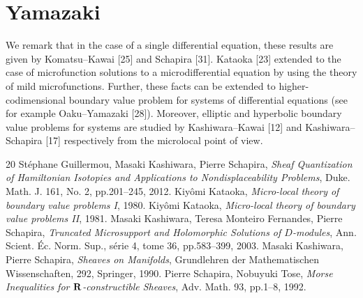 \section{Yamazaki}
We remark that in the case of a single differential equation, 
these results are given by 
Komatsu--Kawai [25] and Schapira [31]. 
Kataoka [23] extended to the case of microfunction solutions 
to a microdifferential equation by using the theory of 
mild microfunctions. 
Further, these facts can be extended to higher-codimensional 
boundary value problem for systems of 
differential equations (see for example Oaku--Yamazaki [28]). 
Moreover, elliptic and hyperbolic boundary value problems 
for systems are studied by Kashiwara--Kawai [12] and 
Kashiwara--Schapira [17] respectively from 
the microlocal point of view.

\begin{thebibliography}{20} 
   St\'ephane Guillermou, 
  Masaki Kashiwara, Pierre Schapira, 
  \textit{Sheaf Quantization of Hamiltonian Isotopies and Applications to Nondisplaceability Problems}, 
  Duke. Math. J. 161, No. 2, pp.201--245, 2012.  
   Kiy\^omi Kataoka, 
  \textit{Micro-local theory of boundary value problems I}, 1980.
   Kiy\^omi Kataoka, 
  \textit{Micro-local theory of boundary value problems II}, 1981.
   Masaki Kashiwara, Teresa Monteiro Fernandes, Pierre Schapira, 
    \textit{Truncated Microsupport and Holomorphic Solutions 
    of \(D\)-modules}, 
    Ann. Scient. \'Ec. Norm. Sup., s\'erie 4, tome 36, 
    pp.583--399, 2003.
   Masaki Kashiwara, Pierre Schapira, 
    \textit{Sheaves on Manifolds}, 
    Grundlehren der Mathematischen Wissenschaften, 292, Springer, 1990.
   Pierre Schapira, Nobuyuki Tose, 
    \textit{Morse Inequalities for \(\mathbf{R}\)-constructible Sheaves}, 
    Adv. Math. 93, pp.1--8, 1992. 
\end{thebibliography}



